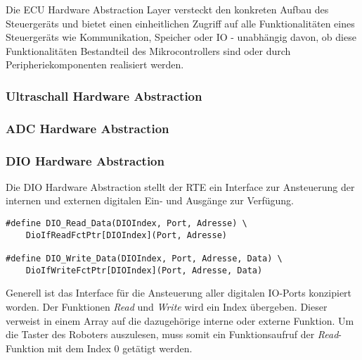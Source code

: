 Die ECU Hardware Abstraction Layer versteckt den konkreten Aufbau des Steuergeräts und bietet einen einheitlichen Zugriff auf alle Funktionalitäten eines Steuergeräts wie Kommunikation, Speicher oder IO - unabhängig davon, ob diese Funktionalitäten Bestandteil des Mikrocontrollers sind oder durch Peripheriekomponenten realisiert werden.


\subsubsection{Ultraschall Hardware Abstraction}


\subsubsection{ADC Hardware Abstraction}

\subsubsection{DIO Hardware Abstraction}

Die DIO Hardware Abstraction stellt der RTE ein Interface zur Ansteuerung der internen und externen digitalen Ein- und Ausgänge zur Verfügung.

\begin{lstlisting}[frame=single,caption={DIO Interface},captionpos=b]  
#define DIO_Read_Data(DIOIndex, Port, Adresse) \
	DioIfReadFctPtr[DIOIndex](Port, Adresse)
	
#define DIO_Write_Data(DIOIndex, Port, Adresse, Data) \
	DioIfWriteFctPtr[DIOIndex](Port, Adresse, Data)
\end{lstlisting}\newline\newline
%
%
Generell ist das Interface für die Ansteuerung aller digitalen IO-Ports konzipiert worden.
Der Funktionen \textit{Read} und \textit{Write} wird ein Index übergeben. Dieser verweist in einem Array auf die dazugehörige interne oder externe Funktion.\newline\newline
%
Um die Taster des Roboters auszulesen, muss somit ein Funktionsaufruf der \textit{Read}-Funktion mit dem Index 0 getätigt werden.

